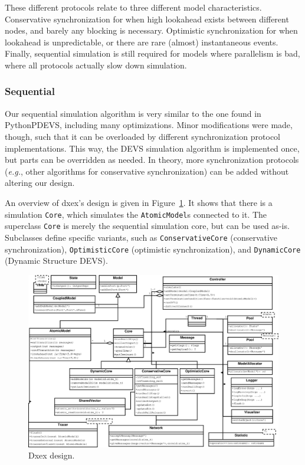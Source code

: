 These different protocols relate to three different model characteristics.
Conservative synchronization for when high lookahead exists between different nodes, and barely any blocking is necessary.
Optimistic synchronization for when lookahead is unpredictable, or there are rare (almost) instantaneous events.
Finally, sequential simulation is still required for models where parallelism is bad, where all protocols actually slow down simulation.

\subsubsection{Sequential}
Our sequential simulation algorithm is very similar to the one found in PythonPDEVS, including many optimizations.
Minor modifications were made, though, such that it can be overloaded by different synchronization protocol implementations.
This way, the \textsf{DEVS} simulation algorithm is implemented once, but parts can be overridden as needed.
In theory, more synchronization protocols (\textit{e.g.}, other algorithms for conservative synchronization) can be added without altering our design.

An overview of dxex's design is given in Figure~\ref{fig:class_diagram}.
It shows that there is a simulation \texttt{Core}, which simulates the \texttt{AtomicModel}s connected to it.
The superclass \texttt{Core} is merely the sequential simulation core, but can be used as-is.
Subclasses define specific variants, such as \texttt{ConservativeCore} (conservative synchronization), \texttt{OptimisticCore} (optimistic synchronization), and \texttt{DynamicCore} (\textsf{Dynamic Structure DEVS}).

\begin{figure}
    \includegraphics[width=\columnwidth]{fig/cores_class_diagram.eps}
	\caption{Dxex design.}
	\label{fig:class_diagram}
\end{figure}

